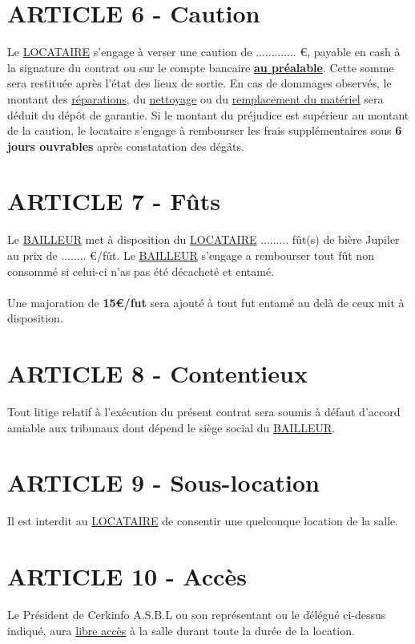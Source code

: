 \documentclass{article}
\begin{document}
\newpage

\section*{ARTICLE 6 - Caution}
Le \underline{LOCATAIRE} s’engage à verser une caution de ............. €, payable en cash à la signature du contrat ou sur le compte bancaire \textbf{\underline{au préalable}}. Cette somme sera restituée après l’état des lieux de sortie. En cas de dommages observés, le montant des \underline{réparations}, du \underline{nettoyage} ou du \underline{remplacement du matériel} sera déduit du dépôt de garantie. Si le montant du préjudice est supérieur au montant de la caution, le locataire s’engage à rembourser les frais supplémentaires sous \textbf{6 jours ouvrables} après constatation des dégâts.

\section*{ARTICLE 7 - Fûts}
Le \underline{BAILLEUR} met à disposition du \underline{LOCATAIRE} ......... fût(s) de bière Jupiler au prix de ........ €/fût. Le \underline{BAILLEUR} s'engage a rembourser tout fût non consommé si celui-ci n'as pas été décacheté et entamé.\\\\
Une majoration de \textbf{15€/fut} sera ajouté à tout fut entamé au delà de ceux mit à disposition.

\section*{ARTICLE 8 - Contentieux}
Tout litige relatif à l’exécution du présent contrat sera soumis à défaut d’accord amiable aux tribunaux dont dépend le siège social du \underline{BAILLEUR}.

\section*{ARTICLE 9 - Sous-location}
Il est interdit au \underline{LOCATAIRE} de consentir une quelconque location de la salle.

\section*{ARTICLE 10 - Accès}
Le Président de Cerkinfo A.S.B.L ou son représentant ou le délégué ci-dessus indiqué, aura \underline{libre accès} à la salle durant toute la durée de la location.
\end{document}
